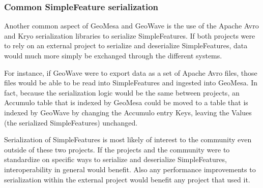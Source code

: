 \subsubsection{Common SimpleFeature serialization}
\label{sec:conclusions:collaboration:serialization}

Another common aspect of GeoMesa and GeoWave is the use of the Apache Avro and Kryo serialization libraries to serialize SimpleFeatures.
If both projects were to rely on an external project to serialize and deserialize SimpleFeatures, data would much more simply be exchanged through the different systems.

For instance, if GeoWave were to export data as a set of Apache Avro files, those files would be able to be read into SimpleFeatures and ingested into GeoMesa.
In fact, because the serialization logic would be the same between projects, an Accumulo table that is indexed by GeoMesa could be moved to a table that is indexed by GeoWave by changing the Accumulo entry Keys, leaving the Values (the serialized SimpleFeatures) unchanged.

Serialization of SimpleFeatures is most likely of interest to the community even outside of these two projects.
If the projects and the community were to standardize on specific ways to serialize and deserialize SimpleFeatures, interoperability in general would benefit.
Also any performance improvements to serialization within the external project would benefit any project that used it.
